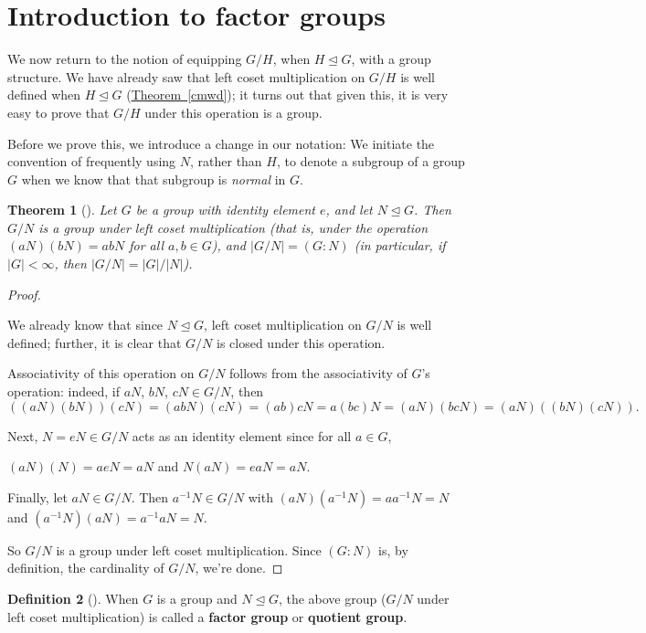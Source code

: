 \documentclass[10pt,]{book}
\newcommand{\terminology}[1]{\textbf{#1}}
\theoremstyle{plain}
\newtheorem{theorem}{Theorem}[section]
\theoremstyle{definition}
\newtheorem{definition}[theorem]{Definition}
\theoremstyle{definition}
\theoremstyle{definition}
\theoremstyle{definition}
\numberwithin{equation}{section}
\newcommand{\lt}{<}
\begin{document}
\section[{Introduction to factor groups}]{Introduction to factor groups}\label{section-27}
We now return to the notion of equipping \(G/H\), when \(H\unlhd G\), with a group structure. We have already saw that left coset multiplication on \(G/H\) is well defined when \(H\unlhd G\) (\hyperref[cmwd]{Theorem~\ref{cmwd}}); it turns out that given this, it is very easy to prove that \(G/H\) under this operation is a group.%
\par
Before we prove this, we introduce a change in our notation: We initiate the convention of frequently using \(N\), rather than \(H\), to denote a subgroup of a group \(G\) when we know that that subgroup is \emph{normal} in \(G\).%
\begin{theorem}[{}]\label{theorem-53}
Let \(G\) be a group with identity element \(e\), and let \(N\unlhd G\). Then \(G/N\) is a group under left coset multiplication (that is, under the operation \((aN)(bN)=abN\) for all \(a,b\in G\)), and \(|G/N|=(G:N)\) (in particular, if \(|G|\lt \infty\), then \(|G/N|=|G|/|N|\)).%
\end{theorem}
\begin{proof}\hypertarget{proof-46}{}
We already know that since \(N\unlhd G\), left coset multiplication on \(G/N\) is well defined; further, it is clear that \(G/N\) is closed under this operation.%
\par
Associativity of this operation on \(G/N\) follows from the associativity of \(G\)'s operation: indeed, if \(aN\), \(bN\), \(cN \in
G/N\), then%
\begin{equation*}
((aN)(bN))(cN)=(abN)(cN)=(ab)cN=a(bc)N=(aN)(bcN)=(aN)((bN)(cN)).
\end{equation*}
%
\par
Next, \(N=eN\in G/N\) acts as an identity element since for all \(a\in
G\),%
\par
\((aN)(N)=aeN=aN\) and \(N(aN)=eaN=aN\).%
\par
Finally, let \(aN\in G/N\). Then \(a^{-1}N\in G/N\) with \((aN)(a^{-1}N)=aa^{-1}N=N\) and \((a^{-1}N)(aN)=a^{-1}aN=N\).%
\par
So \(G/N\) is a group under left coset multiplication. Since \((G:N)\) is, by definition, the cardinality of \(G/N\), we're done.%
\end{proof}
\begin{definition}[{}]\label{definition-69}
When \(G\) is a group and \(N\unlhd G\), the above group (\(G/N\) under left coset multiplication) is called a \terminology{factor group} or \terminology{quotient group}.%
\label{notation-42}
\end{definition}
\end{document}
